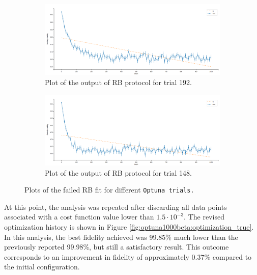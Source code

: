 \begin{figure}[h!]
    \begin{subfigure}[t]{0.495\textwidth}
        \includegraphics[width=\textwidth]{figures/png/RB_optimization/Optuna/1000beta/failed3.png}
        \caption{Plot of the output of RB protocol for trial 192.}
        \label{fig:optuna1000beta:failed3}
    \end{subfigure}
    \hfill
    \begin{subfigure}[t]{0.495\textwidth}
        \includegraphics[width=\textwidth]{figures/png/RB_optimization/Optuna/1000beta/failed4.png}
        \caption{Plot of the output of RB protocol for trial 148.}
        \label{fig:optuna1000beta:failed4}
    \end{subfigure}

    \caption{Plots of the failed RB fit for different \tt{Optuna} trials.}
    \label{fig:RBfailed}
\end{figure}

At this point, the analysis was repeated after discarding all data points associated with a cost function value lower than $1.5 \cdot 10^{-3}$. 
The revised optimization history is shown in Figure \ref{fig:optuna1000beta:optimization_true}. 
In this analysis, the best fidelity achieved was 99.85\% much lower than the previously reported 99.98\%, but still a satisfactory result. 
This outcome corresponds to an improvement in fidelity of approximately 0.37\% compared to the initial configuration.

